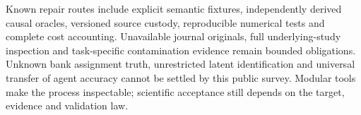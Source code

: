 Known repair routes include explicit semantic fixtures, independently derived causal oracles, versioned source custody, reproducible numerical tests and complete cost accounting. Unavailable journal originals, full underlying-study inspection and task-specific contamination evidence remain bounded obligations. Unknown bank assignment truth, unrestricted latent identification and universal transfer of agent accuracy cannot be settled by this public survey. Modular tools make the process inspectable; scientific acceptance still depends on the target, evidence and validation law.\citep{exec25_cow_reference}
